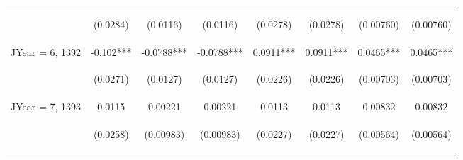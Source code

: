 \documentclass[]{article}
\begin{document}
\begin{center}
\begin{tabular}{lccccccc}
\vspace{4pt} & \begin{footnotesize}(0.0284)\end{footnotesize} & \begin{footnotesize}(0.0116)\end{footnotesize} & \begin{footnotesize}(0.0116)\end{footnotesize} & \begin{footnotesize}(0.0278)\end{footnotesize} & \begin{footnotesize}(0.0278)\end{footnotesize} & \begin{footnotesize}(0.00760)\end{footnotesize} & \begin{footnotesize}(0.00760)\end{footnotesize} \\
JYear = 6, 1392 & -0.102*** & -0.0788*** & -0.0788*** & 0.0911*** & 0.0911*** & 0.0465*** & 0.0465*** \\
\vspace{4pt} & \begin{footnotesize}(0.0271)\end{footnotesize} & \begin{footnotesize}(0.0127)\end{footnotesize} & \begin{footnotesize}(0.0127)\end{footnotesize} & \begin{footnotesize}(0.0226)\end{footnotesize} & \begin{footnotesize}(0.0226)\end{footnotesize} & \begin{footnotesize}(0.00703)\end{footnotesize} & \begin{footnotesize}(0.00703)\end{footnotesize} \\
JYear = 7, 1393 & 0.0115 & 0.00221 & 0.00221 & 0.0113 & 0.0113 & 0.00832 & 0.00832 \\
\vspace{4pt} & \begin{footnotesize}(0.0258)\end{footnotesize} & \begin{footnotesize}(0.00983)\end{footnotesize} & \begin{footnotesize}(0.00983)\end{footnotesize} & \begin{footnotesize}(0.0227)\end{footnotesize} & \begin{footnotesize}(0.0227)\end{footnotesize} & \begin{footnotesize}(0.00564)\end{footnotesize} & \begin{footnotesize}(0.00564)\end{footnotesize} \\

\end{tabular}
\end{center}
\end{document}
